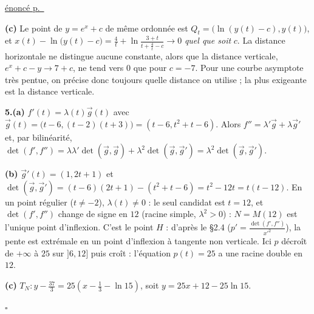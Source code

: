 \documentclass[a4paper,11pt]{article}
\numberwithin{equation}{section}
\numberwithin{figure}{section}
\numberwithin{table}{section}
\theoremstyle{enonce}
\theoremstyle{exemple}
\theoremstyle{remarque}
\newenvironment{corrige}[1]{%
  \par\needspace{6\baselineskip}\vspace{1em}\phantomsection\label{c:#1}%
  \noindent{\sffamily\bfseries\color{Bleu}Exercice~\ref{e:#1}}\quad
  {\scriptsize\sffamily\hyperref[e:#1]{\color{Gris}énoncé p.~\pageref{e:#1}}}\par\nobreak\vspace{0.2em}}%
  {\hfill\textcolor{BleuClair}{$\square$}\par}
\newcommand{\ve}[1]{\vec{#1}}
\begin{document}
\begin{corrige}{ds-pb}
\textbf{(c)} Le point de $y=e^x+c$ de même ordonnée est $Q_t=\big(\ln(y(t)-c),y(t)\big)$, et
$x(t)-\ln\big(y(t)-c\big)=\frac4t+\ln\frac{3+t}{t+\frac4t-c}\to0$ \emph{quel que soit} $c$. La distance horizontale ne
distingue aucune constante, alors que la distance verticale, $e^x+c-y\to7+c$, ne tend vers $0$ que pour $c=-7$. Pour une courbe
asymptote très pentue, on précise donc toujours quelle distance on utilise ; la plus exigeante est la distance verticale.

\textbf{5.(a)} $f'(t)=\lambda(t)\ve g(t)$ avec $\ve g(t)=\big(t-6,(t-2)(t+3)\big)=(t-6,t^2+t-6)$. Alors
$f''=\lambda'\ve g+\lambda\ve g'$ et, par bilinéarité, $\det(f',f'')=\lambda\lambda'\det(\ve g,\ve g)+\lambda^2\det(\ve g,\ve g')=\lambda^2\det(\ve g,\ve g')$.

\textbf{(b)} $\ve g'(t)=(1,2t+1)$ et $\det(\ve g,\ve g')=(t-6)(2t+1)-(t^2+t-6)=t^2-12t=t(t-12)$. En un point régulier
($t\neq-2$), $\lambda(t)\neq0$ : le seul candidat est $t=12$, et $\det(f',f'')$ change de signe en $12$ (racine simple, $\lambda^2>0$) :
$N=M(12)$ est l'unique point d'inflexion. C'est le point $H$ : d'après le \S2.4 ($p'=\frac{\det(f',f'')}{x'^2}$), la pente est extrémale en un
point d'inflexion à tangente non verticale. Ici $p$ décroît de $+\infty$ à $25$ sur $]6,12]$ puis croît : l'équation $p(t)=25$ a une
racine double en $12$.

\textbf{(c)} $T_N:y-\frac{37}3=25\left(x-\frac13-\ln15\right)$, soit $y=25x+12-25\ln15$.


\end{corrige}
\end{document}
